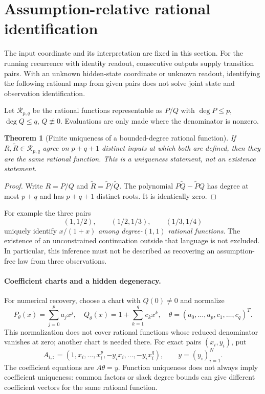 \documentclass[11pt]{article}
\newtheorem{theorem}{Theorem}[section]
\theoremstyle{definition}
\begin{document}
\section{Assumption-relative rational identification}
\label{sec:identification}

The input coordinate and its interpretation are fixed in this section.
For the running recurrence with identity readout, consecutive outputs supply
transition pairs. With an unknown hidden-state coordinate or unknown
readout, identifying the following rational map from given pairs does not
solve joint state and observation identification.

Let $\mathcal R_{p,q}$ be the rational functions representable as $P/Q$
with $\deg P\leq p$, $\deg Q\leq q$, $Q\not\equiv0$. Evaluations are
only made where the denominator is nonzero.

\begin{theorem}[Finite uniqueness of a bounded-degree rational function]
\label{lr:rational-unique}
If $R,\widetilde R\in\mathcal R_{p,q}$ agree on $p+q+1$ distinct
inputs at which both are defined, then they are the same rational
function. This is a uniqueness statement, not an existence statement.
\end{theorem}
\begin{proof}
Write $R=P/Q$ and $\widetilde R=\widetilde P/\widetilde Q$.
The polynomial $P\widetilde Q-\widetilde P Q$ has degree at most
$p+q$ and has $p+q+1$ distinct roots. It is identically zero.
\end{proof}

For example the three pairs
\[
 (1,1/2),\qquad(1/2,1/3),\qquad(1/3,1/4)
\]
uniquely identify $x/(1+x)$ \emph{among degree-$(1,1)$ rational
functions}. The existence of an unconstrained continuation outside that
language is not excluded. In particular, this inference must not be
described as recovering an assumption-free law from three observations.

\paragraph{Coefficient charts and a hidden degeneracy.}
For numerical recovery, choose a chart with $Q(0)\ne0$ and normalize
\[
 P_\theta(x)=\sum_{j=0}^{p}a_jx^j,
 \quad Q_\theta(x)=1+\sum_{k=1}^{q}c_kx^k,
 \quad\theta=(a_0,\ldots,a_p,c_1,\ldots,c_q)^T.
\]
This normalization does not cover rational functions whose reduced
denominator vanishes at zero; another chart is needed there.
For exact pairs $(x_i,y_i)$, put
\[
 A_{i,:}=(1,x_i,\ldots,x_i^p,-y_ix_i,\ldots,-y_ix_i^q),
 \qquad y=(y_i)_{i=1}^{N}.
\]
The coefficient equations are $A\theta=y$. Function uniqueness does
not always imply coefficient uniqueness: common factors or slack degree
bounds can give different coefficient vectors for the same rational
function.
\end{document}
